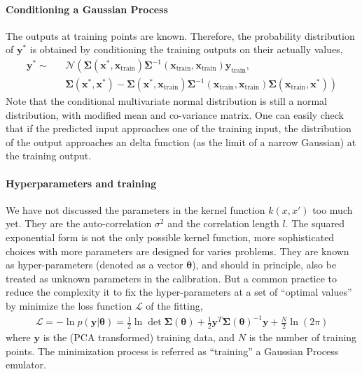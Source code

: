 \paragraph{Conditioning a Gaussian Process} The outputs at training points are known.
Therefore, the probability distribution of $\mathbf{y}^*$ is obtained by conditioning the training outputs on their actually values,
\begin{eqnarray}
\mathbf{y}^* \sim &&\mathcal{N}\left(
\mathbf{\Sigma}(\mathbf{x}^*, \mathbf{x}_{\textrm{train}} )
\mathbf{\Sigma}^{-1}(\mathbf{x}_{\textrm{train}}, \mathbf{x}_{\textrm{train}} )\mathbf{y}_{\textrm{train}},\right.\\\nonumber
&&\left.
\mathbf{\Sigma}(\mathbf{x}^*, \mathbf{x}^*) - 
\mathbf{\Sigma}(\mathbf{x}^*, \mathbf{x}_{\textrm{train}} )
\mathbf{\Sigma}^{-1}(\mathbf{x}_{\textrm{train}}, \mathbf{x}_{\textrm{train}} )
\mathbf{\Sigma}(\mathbf{x}_{\textrm{train}},\mathbf{x}^*)
\right)
\end{eqnarray}
Note that the conditional multivariate normal distribution is still a normal distribution, with modified mean and co-variance matrix.
One can easily check that if the predicted input approaches one of the training input, the distribution of the output approaches an delta function (as the limit of a narrow Gaussian) at the training output.

\paragraph{Hyperparameters and training} We have not discussed the parameters in the kernel function $k(x, x')$ too much yet.
They are the auto-correlation $\sigma^2$ and the correlation length $l$. 
The squared exponential form is not the only possible kernel function, more sophisticated choices with more parameters are designed for varies problems.
They are known as hyper-parameters (denoted as a vector $\mathbf{\theta}$), and should in principle, also be treated as unknown parameters in the calibration.
But a common practice to reduce the complexity it to fix the hyper-parameters at a set of ``optimal values'' by minimize the loss function $\mathcal{L}$ of the fitting,
\begin{eqnarray}
\mathcal{L} = -\ln p(\mathbf{y}|\mathbf{\theta}) = \frac{1}{2}\ln \det \mathbf{\Sigma}(\mathbf{\theta})  + \frac{1}{2}\mathbf{y}^T \mathbf{\Sigma}(\mathbf{\theta})^{-1} \mathbf{y} + \frac{N}{2}\ln(2\pi)
\end{eqnarray}
where $\mathbf{y}$ is the (PCA transformed) training data, and $N$ is the number of training points.
The minimization process is referred as ``training'' a Gaussian Process emulator.

